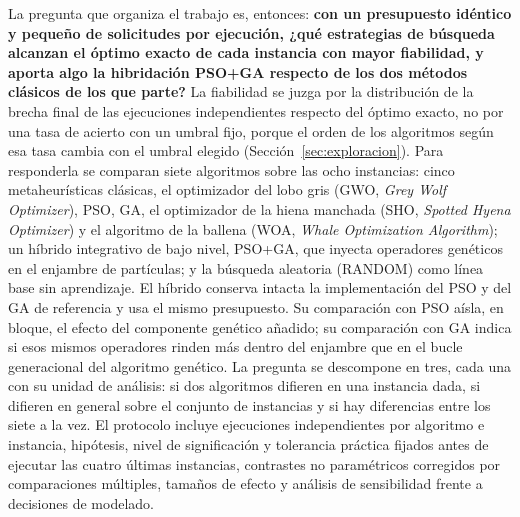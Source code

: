 La pregunta que organiza el trabajo es, entonces: \textbf{con un presupuesto idéntico y pequeño de \RequestsPerRun{} solicitudes por ejecución, ¿qué estrategias de búsqueda alcanzan el óptimo exacto de cada instancia con mayor fiabilidad, y aporta algo la hibridación PSO+GA respecto de los dos métodos clásicos de los que parte?} La fiabilidad se juzga por la distribución de la brecha final de las ejecuciones independientes respecto del óptimo exacto, no por una tasa de acierto con un umbral fijo, porque el orden de los algoritmos según esa tasa cambia con el umbral elegido (Sección~\ref{sec:exploracion}). Para responderla se comparan siete algoritmos sobre las ocho instancias: cinco metaheurísticas clásicas, el optimizador del lobo gris (GWO, \emph{Grey Wolf Optimizer}), PSO, GA, el optimizador de la hiena manchada (SHO, \emph{Spotted Hyena Optimizer}) y el algoritmo de la ballena (WOA, \emph{Whale Optimization Algorithm}); un híbrido integrativo de bajo nivel, PSO+GA, que inyecta operadores genéticos en el enjambre de partículas; y la búsqueda aleatoria (RANDOM) como línea base sin aprendizaje. El híbrido conserva intacta la implementación del PSO y del GA de referencia y usa el mismo presupuesto. Su comparación con PSO aísla, en bloque, el efecto del componente genético añadido; su comparación con GA indica si esos mismos operadores rinden más dentro del enjambre que en el bucle generacional del algoritmo genético. La pregunta se descompone en tres, cada una con su unidad de análisis: si dos algoritmos difieren en una instancia dada, si difieren en general sobre el conjunto de instancias y si hay diferencias entre los siete a la vez. El protocolo incluye \Replicates{} ejecuciones independientes por algoritmo e instancia, hipótesis, nivel de significación y tolerancia práctica fijados antes de ejecutar las cuatro últimas instancias, contrastes no paramétricos corregidos por comparaciones múltiples, tamaños de efecto y análisis de sensibilidad frente a decisiones de modelado.
